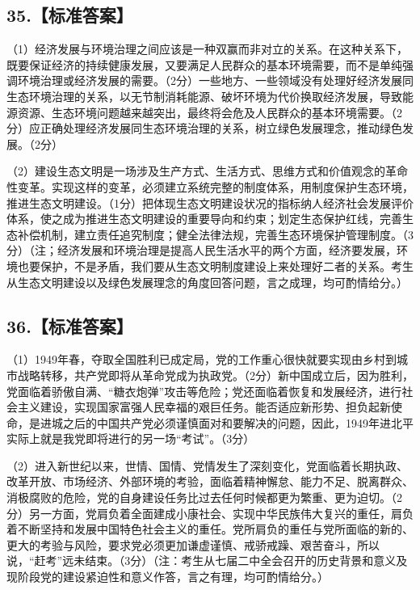 \documentclass[UTF8,11pt]{ctexart}
\begin{document}
\subsection*{35.【标准答案】}

（1）经济发展与环境治理之间应该是一种双赢而非对立的关系。在这种关系下，既要保证经济的持续健康发展，又要满足人民群众的基本环境需要，而不是单纯强调环境治理或经济发展的需要。（2分）一些地方、一些领域没有处理好经济发展同生态环境治理的关系，以无节制消耗能源、破坏环境为代价换取经济发展，导致能源资源、生态环境问题越来越突出，最终将会危及人民群众的基本环境需要。（2分）应正确处理经济发展同生态环境治理的关系，树立绿色发展理念，推动绿色发展。（2分）


（2）建设生态文明是一场涉及生产方式、生活方式、思维方式和价值观念的革命性变革。实现这样的变革，必须建立系统完整的制度体系，用制度保护生态环境，推进生态文明建设。（1分）把体现生态文明建设状况的指标纳人经济社会发展评价体系，使之成为推进生态文明建设的重要导向和约束；划定生态保护红线，完善生态补偿机制，建立责任追究制度；健全法律法规，完善生态环境保护管理制度。（3分）（注；经济发展和环境治理是提高人民生活水平的两个方面，经济要发展，环境也要保护，不是矛盾，我们要从生态文明制度建设上来处理好二者的关系。考生从生态文明建设以及绿色发展理念的角度回答问题，言之成理，均可酌情给分。）


\subsection*{36.【标准答案】}

（1）1949年春，夺取全国胜利已成定局，党的工作重心很快就要实现由乡村到城市战略转移，共产党即将从革命党成为执政党。（2分）新中国成立后，因为胜利，党面临着骄傲自满、“糖衣炮弹”攻击等危险；党还面临着恢复和发展经济，进行社会主义建设，实现国家富强人民幸福的艰巨任务。能否适应新形势、担负起新使命，是进城之后的中国共产党必须谨慎面对和要解决的问题，因此，1949年进北平实际上就是我党即将进行的另一场“考试”。（3分）


（2）进入新世纪以来，世情、国情、党情发生了深刻变化，党面临着长期执政、改革开放、市场经济、外部环境的考验，面临着精神懈怠、能力不足、脱离群众、消极腐败的危险，党的自身建设任务比过去任何时候都更为繁重、更为迫切。（2分）另一方面，党肩负着全面建成小康社会、实现中华民族伟大复兴的重任，肩负着不断坚持和发展中国特色社会主义的重任。党所肩负的重任与党所面临的新的、更大的考验与风险，要求党必须更加谦虚谨慎、戒骄戒躁、艰苦奋斗，所以说，“赶考”远未结束。（3分）（注：考生从七届二中全会召开的历史背景和意义及现阶段党的建设紧迫性和意义作答，言之有理，均可酌情给分。）
\end{document}
